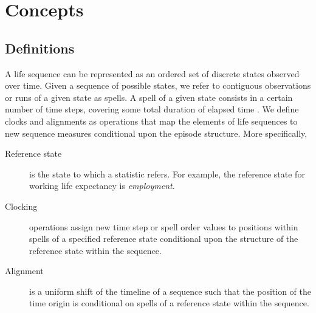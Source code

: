 \documentclass[a4paper,left=1.25cm,right=1.25cm,top=1.25cm,bottom=1.25cm]{article}
\begin{document}

\section{Concepts}

\subsection{Definitions}

A life sequence can be represented as an ordered set of discrete states observed over time. Given a sequence of possible states, we refer to contiguous observations or runs of a given state as spells. A spell of a given state consists in a certain number of time steps, covering some total duration of elapsed time \citep{cornwell2015}. We define clocks and alignments as operations that map the elements of life sequences to new sequence measures conditional upon the episode structure. More specifically,

\begin{description}
    \item[Reference state] is the state to which a statistic refers. For example, the reference state for working life expectancy is \emph{employment}.
    \item[Clocking] operations assign new time step or spell order values to positions within spells of a specified reference state conditional upon the structure of the reference state within the sequence.  
    \item[Alignment] is a uniform shift of the timeline of a sequence such that the position of the time origin is conditional on spells of a reference state within the sequence. 
\end{description}
\end{document}
